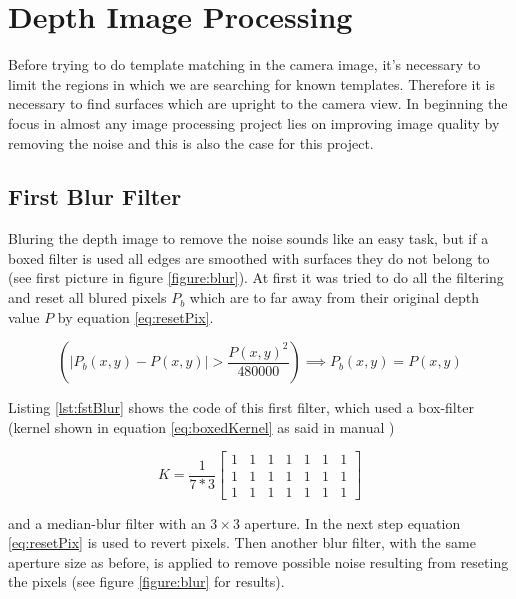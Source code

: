 \section{Depth Image Processing}
Before trying to do template matching in the camera image, it's necessary to limit the regions in which we are
searching for known templates. Therefore it is necessary to find surfaces which are upright to the camera view.
In beginning the focus in almost any image processing project lies on improving image quality by removing the 
noise and this is also the case for this project.

\subsection{First Blur Filter}
Bluring the depth image to remove the noise sounds like an easy task, but if a boxed filter is used 
all edges are smoothed with surfaces they do not belong to (see first picture in figure \vref{figure:blur}).
At first it was tried to do all the filtering and reset all blured pixels $P_b$ which are to far away from their 
original depth value $P$ by equation \ref{eq:resetPix}.
 
\begin{equation}
   \left(\left|{P_b(x,y)-P(x,y)}\right|>{\frac{P(x,y)^2}{480000}}\right)\implies P_b(x,y)=P(x,y)
   \label{eq:resetPix}
\end{equation}

Listing \vref{lst:fstBlur} shows the code of this first filter, which used a box-filter
(kernel shown in equation \vref{eq:boxedKernel} as said in manual \cite{willowgarage:opencv:boxed})

\begin{equation}
	K=\frac{1}{7*3}
	\begin{bmatrix} 1 & 1 & 1 & 1 & 1 & 1 & 1\\ 
					1 & 1 & 1 & 1 & 1 & 1 & 1\\ 
					1 & 1 & 1 & 1 & 1 & 1 & 1 
	\end{bmatrix}
	\label{eq:boxedKernel}
\end{equation}

and a median-blur filter with an $3 \times 3$ aperture. In the next step equation \ref{eq:resetPix} is used 
to revert pixels. Then another blur filter, with the same aperture size as before, 
is applied to remove possible noise resulting from reseting the pixels (see figure \vref{figure:blur} for results).

